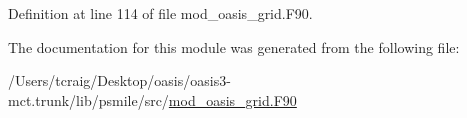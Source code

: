 Definition at line 114 of file mod\+\_\+oasis\+\_\+grid.\+F90.



The documentation for this module was generated from the following file\+:\begin{DoxyCompactItemize}
\item 
/\+Users/tcraig/\+Desktop/oasis/oasis3-\/mct.\+trunk/lib/psmile/src/\hyperlink{mod__oasis__grid_8_f90}{mod\+\_\+oasis\+\_\+grid.\+F90}\end{DoxyCompactItemize}
